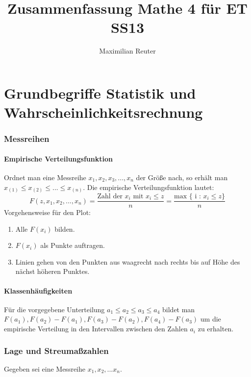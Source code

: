 \documentclass[12pt,a4paper]{article}
\author{Maximilian Reuter}
\title{Zusammenfassung Mathe 4 für ET SS13}
\begin{document}
\maketitle
\tableofcontents
\newpage

\part{Grundbegriffe Statistik und Wahrscheinlichkeitsrechnung}
\section{Messreihen}
\subsection{Empirische Verteilungsfunktion}
Ordnet man eine Messreihe $x_1, x_2, x_3,...,x_n$ der Größe nach, so erhält man $x_{(1)} \leq x_{(2)} \leq ... \leq x_{(n)}$. Die empirische Verteilungsfunktion lautet:
\[F(z,x_1,x_2,...,x_n) = \frac{\text{Zahl der $x_i$ mit $x_i \leq z$}}{n} = \frac{\text{max } \{\text{ i : } x_i \leq z \}}{n}\]
Vorgehensweise für den Plot:
\begin{enumerate}
\item
Alle $F(x_i)$ bilden.
\item
$F(x_i)$ als Punkte auftragen.
\item
Linien gehen von den Punkten aus waagrecht nach rechts bis auf Höhe des nächst höheren Punktes.
\end{enumerate}

\subsection{Klassenhäufigkeiten}
Für die vorgegebene Unterteilung $a_1 \leq a_2 \leq a_3 \leq a_4$ bildet man $F(a_1) , F(a_2) - F(a_1),F(a_3)-F(a_2),F(a_4)-F(a_3)$ um die empirische Verteilung in den Intervallen zwischen den Zahlen $a_i$ zu erhalten. 

\section{Lage und Streumaßzahlen}
Gegeben sei eine Messreihe $x_1, x_2,...x_n$.
\end{document}
